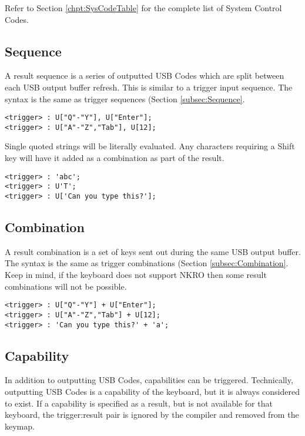 \documentclass{kiibohd-template}
\begin{document}
Refer to Section \ref{chpt:SysCodeTable} for the complete list of System Control Codes.


\subsection{Sequence}

A result sequence is a series of outputted USB Codes which are split between each USB output buffer refresh.
This is similar to a trigger input sequence.
The syntax is the same as trigger sequences (Section \ref{subsec:Sequence}.

\begin{lstlisting}
<trigger> : U["Q"-"Y"], U["Enter"];
<trigger> : U["A"-"Z","Tab"], U[12];
\end{lstlisting}

Single quoted strings will be literally evaluated.
Any characters requiring a Shift key will have it added as a combination as part of the result.

\begin{lstlisting}
<trigger> : 'abc';
<trigger> : U'T';
<trigger> : U['Can you type this?'];
\end{lstlisting}


\subsection{Combination}

A result combination is a set of keys sent out during the same USB output buffer.
The syntax is the same as trigger combinations (Section \ref{subsec:Combination}.
Keep in mind, if the keyboard does not support NKRO then some result combinations will not be possible.

\begin{lstlisting}
<trigger> : U["Q"-"Y"] + U["Enter"];
<trigger> : U["A"-"Z","Tab"] + U[12];
<trigger> : 'Can you type this?' + 'a';
\end{lstlisting}


\subsection{Capability}

In addition to outputting USB Codes, capabilities can be triggered.
Technically, outputting USB Codes is a capability of the keyboard, but it is always considered to exist.
If a capability is specified as a result, but is not available for that keyboard, the trigger:result pair is ignored by the compiler and removed from the keymap.
\end{document}
